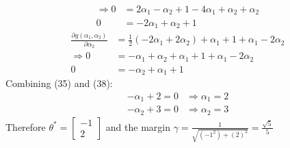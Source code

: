 \documentclass[11pt]{article}
\begin{document}
\begin{enumerate}
{\begin{align}
\Rightarrow 0 &= 2\alpha_1 - \alpha_2 + 1 -4\alpha_1+\alpha_2+\alpha_2 \\
0 &= -2\alpha_1 + \alpha_2 + 1
\end{align}
\begin{align}
\frac{\partial g(\alpha_1, \alpha_2)}{\partial \alpha_2} &= \frac{1}{2}(-2\alpha_1+2\alpha_2)+\alpha_1+1+\alpha_1-2\alpha_2 \\
\Rightarrow 0 &= -\alpha_1+\alpha_2+\alpha_1+1+\alpha_1-2\alpha_2\\
0 &= -\alpha_2+\alpha_1+1
\end{align}
Combining (35) and (38):
\begin{align}
-\alpha_1+2 = 0 &\Rightarrow \alpha_1 = 2 \\
-\alpha_2 + 3 = 0 &\Rightarrow \alpha_2 = 3
\end{align}
Therefore $\theta^* = \begin{bmatrix} -1 \\ 2 \end{bmatrix}$ and the margin $\gamma = \frac{1}{\sqrt{(-1^2)+(2)^2}} = \frac{\sqrt{5}}{5}$
}
\newpage


\end{enumerate}
\end{document}
